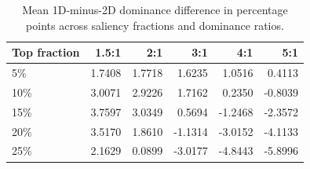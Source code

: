 \begin{table}[t]
\caption{Mean 1D-minus-2D dominance difference in percentage points across saliency fractions and dominance ratios.}
\label{tab:07_directional_sensitivity}
\begin{tabular}{lrrrrr}
\toprule
Top fraction & 1.5:1 & 2:1 & 3:1 & 4:1 & 5:1 \\
\midrule
5\% & 1.7408 & 1.7718 & 1.6235 & 1.0516 & 0.4113 \\
10\% & 3.0071 & 2.9226 & 1.7162 & 0.2350 & -0.8039 \\
15\% & 3.7597 & 3.0349 & 0.5694 & -1.2468 & -2.3572 \\
20\% & 3.5170 & 1.8610 & -1.1314 & -3.0152 & -4.1133 \\
25\% & 2.1629 & 0.0899 & -3.0177 & -4.8443 & -5.8996 \\
\bottomrule
\end{tabular}
\end{table}
